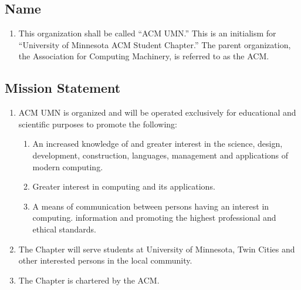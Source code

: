 \subsection{Name}
\begin{enumerate}
	\item This organization shall be called ``ACM UMN.'' This is an initialism for ``University of Minnesota ACM Student Chapter.'' The parent organization, the Association for Computing Machinery, is referred to as the ACM.
\end{enumerate}

\subsection{Mission Statement}
\begin{enumerate}
	\item ACM UMN is organized and will be operated exclusively for educational and scientific purposes to promote the following:
		\begin{enumerate}
			\item An increased knowledge of and greater interest in the science, design, development, construction, languages, management and applications of modern computing.
			\item Greater interest in computing and its applications.
			\item A means of communication between persons having an interest in computing. information and promoting the highest professional and ethical standards.
		\end{enumerate}
	\item The Chapter will serve students at University of Minnesota, Twin Cities and other interested persons in the local community.
	\item The Chapter is chartered by the ACM.
\end{enumerate}
